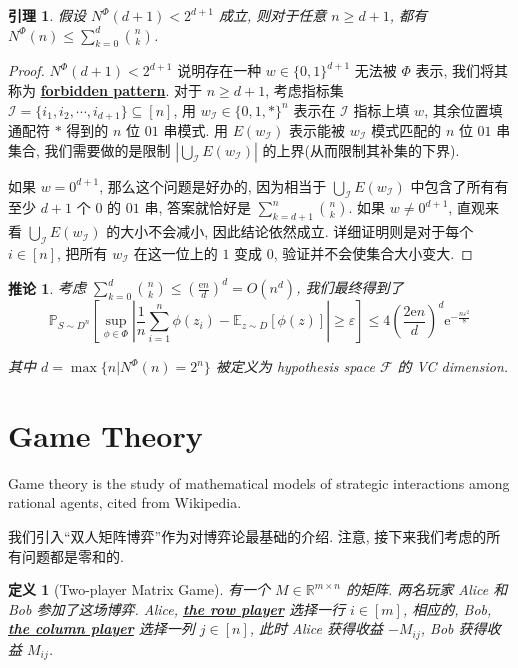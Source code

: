 \documentclass[8pt]{article}
\theoremstyle{compact}
\newtheorem{lemma}[theorem]{引理}
\newtheorem{definition}[theorem]{定义}
\newtheorem{corollary}[theorem]{推论}
\def\obj#1{\textbf{\uline{#1}}}
\def\le{\leqslant}
\def\ge{\geqslant}
\def\e{\mathrm{e}}
\begin{document}
\begin{lemma}
	假设 $N^{\Phi}(d + 1) < 2^{d+1}$ 成立, 则对于任意 $n \ge d + 1$, 都有 $N^{\Phi}(n) \le \sum\limits_{k=0}^{d}\binom nk$.
\end{lemma}
\begin{proof}
	$N^{\Phi}(d + 1) < 2^{d+1}$ 说明存在一种 $w \in \{0, 1\}^{d+1}$ 无法被 $\Phi$ 表示, 我们将其称为 \obj{forbidden pattern}. 对于 $n \ge d + 1$, 考虑指标集 $\mathcal I = \{i_1, i_2, \cdots, i_{d+1}\} \subseteq [n]$, 用 $w_{\mathcal I} \in \{0, 1, *\}^n$ 表示在 $\mathcal I$ 指标上填 $w$, 其余位置填通配符 $*$ 得到的 $n$ 位 $01$ 串模式. 用 $E(w_{\mathcal I})$ 表示能被 $w_{\mathcal I}$ 模式匹配的 $n$ 位 $01$ 串集合, 我们需要做的是限制 $\left|\bigcup_{\mathcal I}E(w_{\mathcal I})\right|$ 的上界(从而限制其补集的下界).

	如果 $w = 0^{d+1}$, 那么这个问题是好办的, 因为相当于 $\bigcup_{\mathcal I}E(w_{\mathcal I})$ 中包含了所有有至少 $d+1$ 个 $0$ 的 $01$ 串, 答案就恰好是 $\sum\limits_{k = d+1}^{n}\binom{n}{k}$. 如果 $w \neq 0^{d+1}$, 直观来看 $\bigcup_{\mathcal I}E(w_{\mathcal I})$ 的大小不会减小, 因此结论依然成立. 详细证明则是对于每个 $i \in [n]$, 把所有 $w_{\mathcal I}$ 在这一位上的 $1$ 变成 $0$, 验证并不会使集合大小变大.
\end{proof}
\begin{corollary}
	考虑 $\sum\limits_{k=0}^d \binom nk \le \left(\frac{\e n}{d}\right)^d = O(n^d)$, 我们最终得到了$$\mathbb P_{S \sim D^n}\left[\sup_{\phi \in \Phi}\left|\frac1n\sum_{i=1}^{n}\phi(z_i) - \mathbb E_{z \sim D}[\phi(z)]\right| \ge \varepsilon\right] \le 4\left(\frac{2\e n}{d}\right)^d\e^{-\frac{n\varepsilon^2}{8}}$$

	其中 $d = \max\{n | N^{\Phi}(n) = 2^n\}$ 被定义为 hypothesis space $\mathcal F$ 的 VC dimension.
\end{corollary}

\newpage
\section{Game Theory}

Game theory is the study of mathematical models of strategic interactions among rational agents, cited from Wikipedia.

我们引入“双人矩阵博弈”作为对博弈论最基础的介绍. 注意, 接下来我们考虑的所有问题都是零和的.

\begin{definition}[Two-player Matrix Game]
	有一个 $M \in \mathbb R^{m \times n}$ 的矩阵. 两名玩家 Alice 和 Bob 参加了这场博弈. Alice, \obj{the row player} 选择一行 $i \in [m]$, 相应的, Bob, \obj{the column player} 选择一列 $j \in [n]$, 此时 Alice 获得收益 $-M_{ij}$, Bob 获得收益 $M_{ij}$.
\end{definition}
\end{document}
